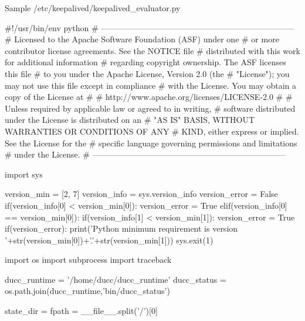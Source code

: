 \begin{minipage}{\textwidth}

	Sample /etc/keepalived/keepalived\_evaluator.py
	
	\begin{greybatim}
	
#!/usr/bin/env python
# -----------------------------------------------------------------------
# Licensed to the Apache Software Foundation (ASF) under one
# or more contributor license agreements.  See the NOTICE file
# distributed with this work for additional information
# regarding copyright ownership.  The ASF licenses this file
# to you under the Apache License, Version 2.0 (the
# "License"); you may not use this file except in compliance
# with the License.  You may obtain a copy of the License at
#
#     http://www.apache.org/licenses/LICENSE-2.0
#
# Unless required by applicable law or agreed to in writing,
# software distributed under the License is distributed on an
# "AS IS" BASIS, WITHOUT WARRANTIES OR CONDITIONS OF ANY
# KIND, either express or implied.  See the License for the
# specific language governing permissions and limitations
# under the License.
# -----------------------------------------------------------------------

import sys

version_min = [2, 7]
version_info = sys.version_info
version_error = False
if(version_info[0] < version_min[0]):
    version_error = True
elif(version_info[0] == version_min[0]):
    if(version_info[1] < version_min[1]):
        version_error = True
if(version_error):
    print('Python minimum requirement is version '+str(version_min[0])+'.'+str(version_min[1]))
    sys.exit(1)

import os
import subprocess
import traceback

ducc_runtime = '/home/ducc/ducc_runtime'
ducc_status = os.path.join(ducc_runtime,'bin/ducc_status')

state_dir = fpath = __file__.split('/')[0]

   	\end{greybatim}
   	
\end{minipage}

